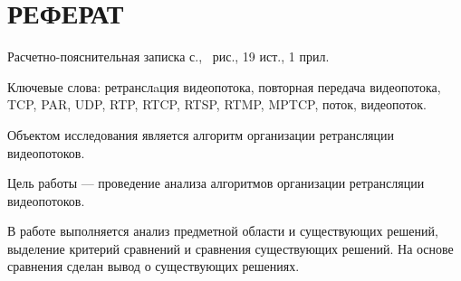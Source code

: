 \chapter*{РЕФЕРАТ}

Расчетно-пояснительная записка \pageref{LastPage} с., \totalfigures\ рис., 19 ист., 1 прил.

Ключевые слова: ретранслaция видеопотока, повторная передача видеопотока, TCP, PAR, UDP, RTP, RTCP, RTSP, RTMP, MPTCP, поток, видеопоток.

Объектом исследования является алгоритм организации ретрансляции видеопотоков.

Цель работы --- проведение анализа алгоритмов организации ретрансляции видеопотоков.

В работе выполняется анализ предметной области и существующих решений, выделение критерий сравнений и сравнения существующих решений.
На основе сравнения сделан вывод о существующих решениях.